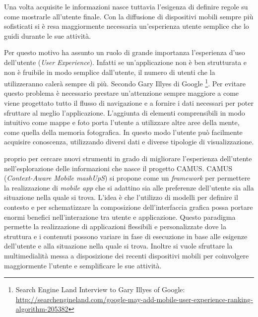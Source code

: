 Una volta acquisite le informazioni nasce tuttavia l'esigenza di definire regole su come mostrarle all'utente finale. Con la diffusione di dispositivi mobili sempre più sofisticati si è resa maggiormente necessaria un'esperienza utente semplice che lo guidi durante le sue attività.


Per questo motivo ha assunto un ruolo di grande importanza l'esperienza d'uso dell'utente (\emph{User Experience}). Infatti se un'applicazione non è ben strutturata e non è fruibile in modo semplice dall'utente, il numero di utenti che la utilizzeranno calerà sempre di più. Secondo Gary Illyes di Google \footnote{Search Engine Land Interview to Gary Illyes of Google: \url{http://searchengineland.com/google-may-add-mobile-user-experience-ranking-algorithm-205382}}. Per evitare questo problema è necessario prestare un'attenzione sempre maggiore a come viene progettato tutto il flusso di navigazione e a fornire i dati necessari per poter sfruttare al meglio l'applicazione. L'aggiunta di elementi comprensibili in modo intuitivo come mappe e foto porta l'utente a utilizzare altre aree della mente, come quella della memoria fotografica. In questo modo l'utente può facilmente acquisire conoscenza, utilizzando diversi dati e diverse tipologie di visualizzazione.


\upe proprio per cercare nuovi strumenti in grado di migliorare l'esperienza dell'u\-ten\-te nell'esplorazione delle informazioni che nasce il progetto CAMUS. CAMUS (\emph{Context-Aware Mobile mashUpS}) si propone come un \emph{framework} per permettere la realizzazione di \emph{mobile app} che si adattino sia alle preferenze dell'utente sia alla situazione nella quale si trova. L'idea è che l'utilizzo di modelli per definire il contesto e per schematizzare la composizione dell'interfaccia grafica possa portare enormi benefici nell'interazione tra utente e applicazione.
Questo paradigma permette la realizzazione di applicazioni flessibili e personalizzate dove la struttura e i contenuti possono variare in fase di esecuzione in base alle esigenze dell'utente e alla situazione nella quale si trova. Inoltre si vuole sfruttare la multimedialità messa a disposizione dei recenti dispositivi mobili per coinvolgere maggiormente l'utente e semplificare le sue attività.

